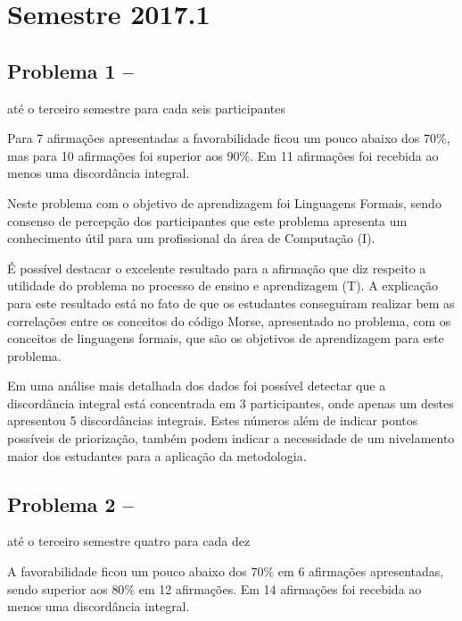 \section{Semestre 2017.1}
\label{sec-sem-2017}

\subsection{Problema 1 -- \ProblemaG}
\label{sec-2017-p1}
{até o terceiro semestre}{ para cada seis participantes}

Para 7 afirmações apresentadas a favorabilidade ficou um pouco abaixo dos $70\%$, mas
para 10 afirmações foi superior aos $90\%$.
Em 11 afirmações foi recebida ao menos uma discordância integral.

Neste problema com o objetivo de aprendizagem foi Linguagens
Formais, sendo consenso de percepção dos participantes que
este problema apresenta um conhecimento útil para um profissional
da área de Computação (I).

É possível destacar o excelente resultado para a afirmação que diz respeito a
utilidade do problema no processo de ensino e aprendizagem (T).
A explicação para este resultado está no fato de que os estudantes
conseguiram realizar bem as correlações entre os conceitos
do código Morse, apresentado no problema, com os conceitos de
linguagens formais, que são os objetivos de aprendizagem para
este problema.

Em uma análise mais detalhada dos dados foi possível
detectar que a discordância integral está concentrada
em 3 participantes, onde apenas um destes apresentou
5 discordâncias integrais.
Estes números além de indicar pontos possíveis de
priorização, também podem indicar a necessidade
de um nivelamento maior dos estudantes para a aplicação
da metodologia.


\subsection{Problema 2 -- \ProblemaB}
{até o terceiro semestre}{ quatro para cada dez}

A favorabilidade ficou um pouco abaixo dos $70\%$ em 6 afirmações apresentadas,
sendo superior aos $80\%$ em 12 afirmações.
Em 14 afirmações foi recebida ao menos uma discordância integral.

